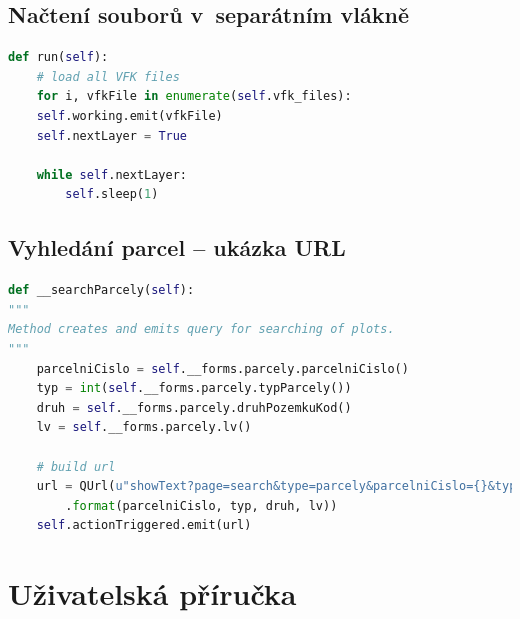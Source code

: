 \documentclass[a4paper,12pt,oneside]{book}
\begin{document}
\section{Načtení souborů v~separátním vlákně}
\begin{lstlisting}[language=Python, 
		    keywordstyle=\color{blue}\ttfamily,
		    stringstyle=\color{red}\ttfamily,
		    commentstyle=\color{green}\ttfamily, morekeywords={qDebug,QString,QgsVectorLayer,QgsMapLayerRegistry,QMessageBox,self},
		    label=l_thread_run]
 def run(self):
    # load all VFK files
    for i, vfkFile in enumerate(self.vfk_files):
	self.working.emit(vfkFile)
	self.nextLayer = True

	while self.nextLayer:
	    self.sleep(1)
\end{lstlisting}

\section{Vyhledání parcel -- ukázka URL}
\begin{lstlisting}[language=Python, 
		    keywordstyle=\color{blue}\ttfamily,
		    stringstyle=\color{red}\ttfamily,
		    commentstyle=\color{green}\ttfamily, morekeywords={QUrl,QString,self},
		    label=l_search_parcely]
def __searchParcely(self):
"""
Method creates and emits query for searching of plots.
"""
    parcelniCislo = self.__forms.parcely.parcelniCislo()
    typ = int(self.__forms.parcely.typParcely())
    druh = self.__forms.parcely.druhPozemkuKod()
    lv = self.__forms.parcely.lv()

    # build url
    url = QUrl(u"showText?page=search&type=parcely&parcelniCislo={}&typ={}&druh={}&lv={}"
		.format(parcelniCislo, typ, druh, lv))
    self.actionTriggered.emit(url)
\end{lstlisting}


\chapter{Uživatelská příručka}



\end{document}
